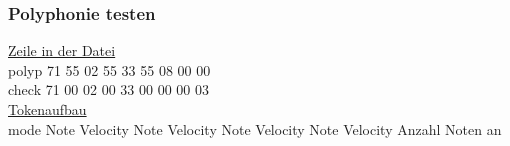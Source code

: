 \subsubsection{Polyphonie testen }

\underline{Zeile in der Datei}\\
polyp \hspace*{2mm} 71 \hspace*{4mm} 55 \hspace*{12mm}  02 \hspace*{6mm} 55 \hspace*{10mm} 33 \hspace*{6mm} 55 \hspace*{10mm} 08 \hspace*{6mm} 00 \hspace*{12mm} 00\\
check \hspace*{2mm} 71 \hspace*{4mm} 00 \hspace*{12mm}  02 \hspace*{6mm} 00 \hspace*{10mm} 33 \hspace*{6mm} 00 \hspace*{10mm} 00 \hspace*{6mm} 00 \hspace*{12mm} 03\\

\underline{Tokenaufbau}\\
mode	\hspace{2mm} Note \hspace*{2mm} 	Velocity	\hspace*{2mm} Note \hspace*{2mm}  Velocity \hspace*{2mm} 	Note \hspace*{2mm} 	Velocity \hspace*{2mm} 	Note \hspace*{2mm} 	Velocity \hspace*{2mm}  Anzahl Noten an\\

